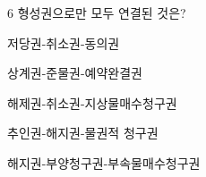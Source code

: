 \begin{question}{6}
형성권으로만 모두 연결된 것은?
\begin{choices}
  \item 저당권-취소권-동의권
  \item 상계권-준물권-예약완결권
  \item 해제권-취소권-지상물매수청구권
  \item 추인권-해지권-물권적 청구권
  \item 해지권-부양청구권-부속물매수청구권
\end{choices}
\end{question}
